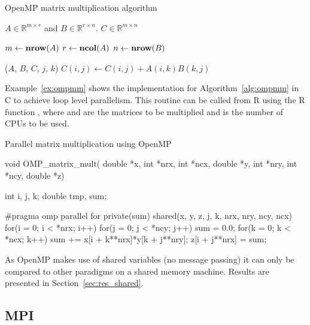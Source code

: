\begin{algorithm}
\caption{OpenMP matrix multiplication algorithm}
\label{alg:ompmm}
\begin{algorithmic}[1]

  \REQUIRE $A \in \mathbb{R}^{m \times r}$ and $B \in \mathbb{R}^{r
    \times n}$.
  \ENSURE $C \in \mathbb{R}^{m \times n}$

  \STATE $m \leftarrow \textbf{nrow} (A)$
  \STATE $r \leftarrow \textbf{ncol} (A)$
  \STATE $n \leftarrow \textbf{nrow} (B)$

  \STATE \OMPFOR \OMPSHARE($A$, $B$, $C$, $j$, $k$)
         \STATE $C(i,j) \leftarrow C(i,j) + A(i,k)B(k,j)$
       \ENDFOR
    \ENDFOR
  \ENDFOR

\end{algorithmic}
\end{algorithm}

Example~\ref{ex:ompmm} shows the implementation for
Algorithm~\ref{alg:ompmm} in C to achieve loop level parallelism. This
routine can be called from R
using the R function , where  and
 are the matrices to be multiplied and  is the
number of CPUs to be used.

\begin{Example} Parallel matrix multiplication using OpenMP
\label{ex:ompmm}
\begin{Scode}

void OMP_matrix_mult( double *x, int *nrx, int *ncx,
		      double *y, int *nry, int *ncy,
		      double *z) {
  int i, j, k;
  double tmp, sum;

#pragma omp parallel for private(sum) shared(x, y, z, j, k, nrx, nry,
                                             ncy, ncx)
  for(i = 0; i < *nrx; i++)
    for(j = 0; j < *ncy; j++){
      sum = 0.0;
      for(k = 0; k < *ncx; k++) 
	sum += x[i + k**nrx]*y[k + j**nry];
      z[i + j**nrx] = sum;
    }
}
\end{Scode}
\end{Example}

As OpenMP makes use of shared variables (no message passing) it can
only be compared to other paradigms on a shared memory
machine. Results are presented in Section~\ref{sec:res_shared}.

\subsection{MPI}
\label{sec:mmMPI}


